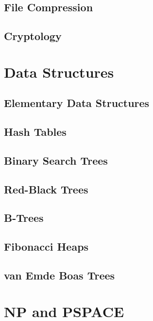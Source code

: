 		\section{File Compression}

		\section{Cryptology}

	\chapter{Data Structures}
		\section{Elementary Data Structures}

		\section{Hash Tables}

		\section{Binary Search Trees}

		\section{Red-Black Trees}

		\section{B-Trees}

		\section{Fibonacci Heaps}

		\section{van Emde Boas Trees}

	\chapter{NP and PSPACE}
